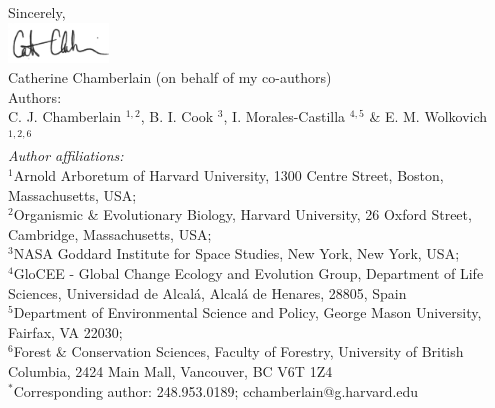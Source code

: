 \documentclass[11pt,a4paper]{article}\usepackage[]{graphicx}\usepackage[]{color}
\begin{document}
\vspace{1.5ex}
\noindent Sincerely, \\
\includegraphics[width=0.2\textwidth]{full_signature.jpg} \\
\noindent Catherine Chamberlain (on behalf of my co-authors)
\vspace{2ex}\\
\noindent Authors:\\
C. J. Chamberlain $^{1,2}$, B. I. Cook $^{3}$, I. Morales-Castilla $^{4,5}$ \& E. M. Wolkovich $^{1,2,6}$
\vspace{2ex}\\
\emph{Author affiliations:}\\
$^{1}$Arnold Arboretum of Harvard University, 1300 Centre Street, Boston, Massachusetts, USA; \\
$^{2}$Organismic \& Evolutionary Biology, Harvard University, 26 Oxford Street, Cambridge, Massachusetts, USA; \\
$^{3}$NASA Goddard Institute for Space Studies, New York, New York, USA; \\
$^{4}$GloCEE - Global Change Ecology and Evolution Group, Department of Life Sciences, Universidad de Alcal\'{a}, Alcal\'{a} de Henares, 28805, Spain \\
$^{5}$Department of Environmental Science and Policy, George Mason University, Fairfax, VA 22030; \\
$^{6}$Forest \& Conservation Sciences, Faculty of Forestry, University of British Columbia, 2424 Main Mall, Vancouver, BC V6T 1Z4\\
\vspace{2ex}
$^*$Corresponding author: 248.953.0189; cchamberlain@g.harvard.edu\\


\end{document}
